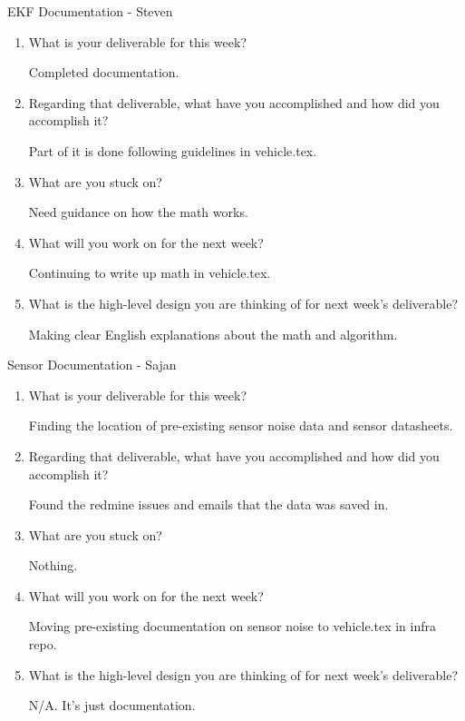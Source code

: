 \documentclass{article}
\begin{document}
\noindent{}EKF Documentation - Steven 
\begin{enumerate}
    \item What is your deliverable for this week?

    Completed documentation.

    \item Regarding that deliverable, what have you accomplished and how did
        you accomplish it?

    Part of it is done following guidelines in vehicle.tex. 

    \item What are you stuck on?

    Need guidance on how the math works.

    \item What will you work on for the next week?
    
    Continuing to write up math in vehicle.tex.

    \item What is the high-level design you are thinking of for next week's
        deliverable?
    
        Making clear English explanations about the math and algorithm.
\end{enumerate}


\noindent{}Sensor Documentation - Sajan
\begin{enumerate}
    \item What is your deliverable for this week?
    
    Finding the location of pre-existing sensor noise data and sensor datasheets.

    \item Regarding that deliverable, what have you accomplished and how did
        you accomplish it?

    Found the redmine issues and emails that the data was saved in.

    \item What are you stuck on?

    Nothing.

    \item What will you work on for the next week?
    
    Moving pre-existing documentation on sensor noise to vehicle.tex in infra repo.

    \item What is the high-level design you are thinking of for next week's
        deliverable?

        N/A. It's just documentation.

\end{enumerate}
\end{document}
